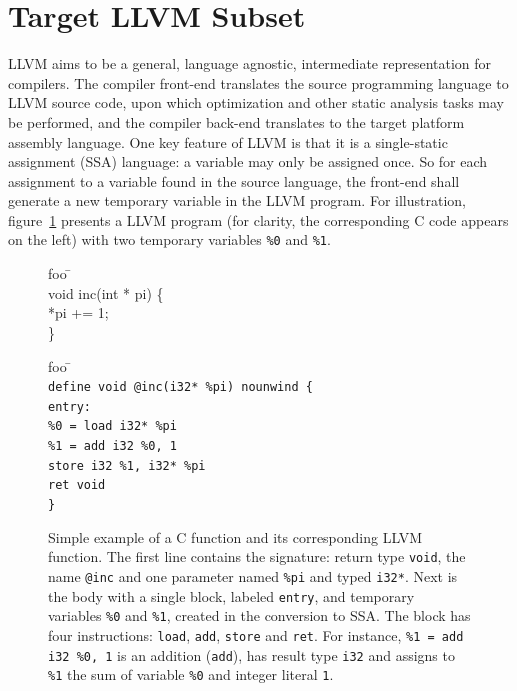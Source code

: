 \documentclass{llncs}
\newcommand{\llvm}[1]{\texttt{#1}}
\begin{document}
\section{Target LLVM Subset}
\label{sec:llvm}

LLVM aims to be a general, language agnostic, intermediate representation for
compilers. The compiler front-end translates the source programming language to
LLVM source code, upon which optimization and other static analysis tasks may be
performed, and the compiler back-end translates to the target platform assembly
language. One key feature of LLVM is that it is a single-static assignment (SSA)
language: a variable may only be assigned once. So for each assignment to a
variable found in the source language, the front-end shall generate a new
temporary variable in the LLVM program. For illustration,
figure~\ref{fig:ex-llvm} presents a LLVM program (for clarity, the corresponding
C code appears on the left) with two temporary variables \llvm{\%0} and
\llvm{\%1}.
\begin{figure}
\vspace*{-3em}
  \begin{minipage}[t]{.3\textwidth}
    \begin{tabbing}
      foo \= \kill  \\
      void inc(int * pi) \{\\
      \> *pi += 1; \\
      \}\end{tabbing}
  \end{minipage}
  \hfill
  \begin{minipage}[t]{.6\textwidth}
    \begin{tabbing}
      foo \= \kill  \\
      \llvm{define void @inc(i32* \%pi) nounwind \{} \\
      \llvm{entry:}                      \\
      \> \llvm{\%0 = load i32* \%pi}     \\
      \> \llvm{\%1 = add i32 \%0, 1}     \\
      \> \llvm{store i32 \%1, i32* \%pi} \\
      \> \llvm{ret void} \\
      \llvm{\}}
    \end{tabbing}
  \end{minipage}
  \caption{Simple example of a C function and its corresponding LLVM function.
    The first line contains the signature: return type \llvm{void}, the name
    \llvm{@inc} and one parameter named \llvm{\%pi} and typed \llvm{i32*}.  Next
    is the body with a single block, labeled \llvm{entry}, and temporary
    variables \llvm{\%0} and \llvm{\%1}, created in the conversion to SSA. The
    block has four instructions: \llvm{load}, \llvm{add}, \llvm{store} and
    \llvm{ret}. For instance, \llvm{\%1 = add i32 \%0, 1} is an addition
    (\llvm{add}), has result type \llvm{i32} and assigns to
    \llvm{\%1} the sum of variable \llvm{\%0} and integer
    literal \llvm{1}.}
  \label{fig:ex-llvm}
\end{figure}
\end{document}

